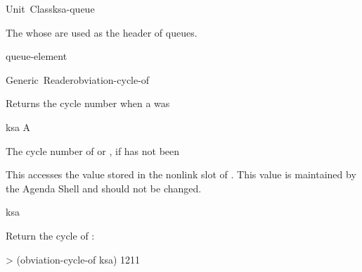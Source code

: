 \documentclass[10pt,twoside,english,pdftex]{article}
\begin{document}

\begin{functiondoc}{Unit~Class}{ksa-queue}{}
%
%
  
\fnsyntax

\fnpackage {}

\fnmodule {}

\fndescription The  whose  are used as
the header of  queues.

\begin{alsos}{queue-element}
\also[queue]
\end{alsos}

\end{functiondoc}


\begin{functiondoc}{Generic~Reader}{obviation-cycle-of}{ 
    \returns{} }
%

\fnsyntax

\fnpurpose Returns the cycle number when a  was 

\fnmethods
{}

\fnpackage {}

\fnmodule {}

\fnargs
\begin{args}{ksa}
\arg[ksa] A 
\end{args}

\fnreturns The  cycle number of  or \nil,
if  has not been 
  
\fndescription 
This  accesses the value stored in the 
 nonlink slot of .  This value is
maintained by the Agenda Shell and should not be changed.

\begin{alsos}{ksa}
\also[ksa]
\end{alsos}

\fnexample
Return the  cycle of :
%
\W\supp
\begin{example}
> (obviation-cycle-of ksa)
1211
\end{example}

\end{functiondoc}
\end{document}
